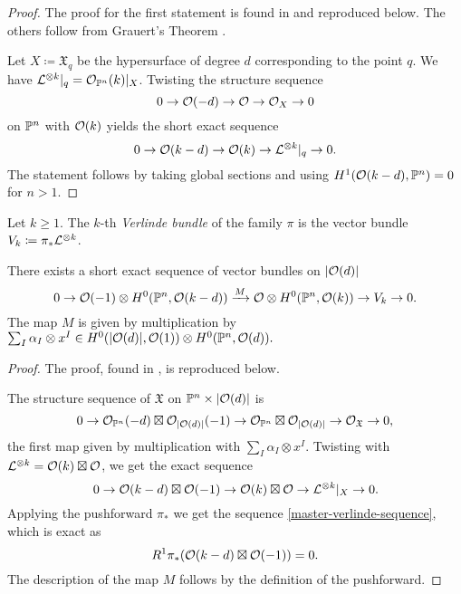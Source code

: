 \begin{proof}
	The proof for the first statement is found in
	\cite[Proposition 4.1]{hemminghaus-verlinde-bundles}
	and reproduced below. The others follow from Grauert's Theorem
	\cite[{}28.1.5]{vakil-algebraic-geometry}.

	Let $X\coloneqq \mathfrak X_q$ be the hypersurface of degree $d$ corresponding to the point $q$. We have $\mathcal{L}^{\otimes k}|_q = \mathcal{O}_{\mathbb{P}^n}(k)|_{X}$. Twisting the structure sequence
	\[0 \to \mathcal{O}(-d) \to \mathcal{O} \to \mathcal{O}_{X} \to 0\]
	on $\mathbb{P}^n$
	with $\mathcal{O}(k)$ yields the short exact sequence
	\[0 \to \mathcal{O}(k-d) \to \mathcal{O}(k) \to \mathcal{L}^{\otimes k}|_q \to 0.\]
	The statement follows by taking global sections and using $H^1(\mathcal{O}(k-d),\mathbb{P}^n)=0$ for $n>1$.
\end{proof}

\begin{definition}Let $k\geq 1$. The $k$-th \emph{Verlinde bundle} of the family $\pi$ is the vector bundle
$V_k \coloneqq \pi_{*}\mathcal{L}^{\otimes k}$.
\end{definition}





\begin{proposition} \label{verlinde-exact-sequence}
	There exists a short exact sequence of vector bundles on $\lvert\mathcal{O}(d)\rvert$ 
	\begin{equation} \label{master-verlinde-sequence}
	0\to  \mathcal{O}(-1) \otimes H^0(\mathbb{P}^n, \mathcal{O}(k-d)) 
	\xrightarrow{M}  \mathcal{O} \otimes {H^0(\mathbb{P}^n, \mathcal{O}(k))   }
	\to{V_k}
	\to 0.
	\end{equation}
	The map $M$ is given by multiplication by
	$\sum_I \alpha_I \otimes x^I \in
	H^0(\lvert\mathcal{O}(d)\rvert,\mathcal{O}(1)) \otimes H^0(\mathbb{P}^n,\mathcal{O}(d)).$
	\end{proposition}

\begin{proof}
	The proof, found in \cite[Proposition 4.2]{hemminghaus-verlinde-bundles}, is reproduced below.

	The structure sequence of $\mathfrak X$ on $\mathbb{P}^n \times \lvert\mathcal{O}(d)\rvert$ is
	\[
		0 \to \mathcal{O}_{\mathbb{P}^n}(-d)\boxtimes \mathcal{O}_{\lvert\mathcal{O}(d)\rvert}(-1) \to \mathcal{O}_{\mathbb{P}^n}\boxtimes \mathcal{O}_{\lvert\mathcal{O}(d)\rvert} \to \mathcal{O}_{\mathfrak X} \to 0,
	\]
	the first map given by multiplication with $\sum_I \alpha_I \otimes x^I$.
	Twisting with $\mathcal{L}^{\otimes k}=\mathcal{O}(k)\boxtimes \mathcal{O}$, we get the exact sequence
	\[
		0 \to \mathcal{O}(k-d)\boxtimes \mathcal{O}(-1) \to \mathcal{O}(k)\boxtimes \mathcal{O} \to \mathcal{L}^{\otimes k}|_X \to 0.
	\]
	Applying the pushforward 
	$\pi_*$
	we get the sequence \cref{master-verlinde-sequence}, 
	which is exact as
	\[
		R^1 \pi_* (\mathcal{O}(k-d)\boxtimes \mathcal{O}(-1)) = 0.
	\]
	The description of the map $M$ follows by the definition of the pushforward.
\end{proof}

